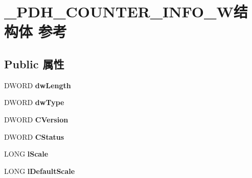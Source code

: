 \hypertarget{struct___p_d_h___c_o_u_n_t_e_r___i_n_f_o___w}{}\section{\+\_\+\+P\+D\+H\+\_\+\+C\+O\+U\+N\+T\+E\+R\+\_\+\+I\+N\+F\+O\+\_\+\+W结构体 参考}
\label{struct___p_d_h___c_o_u_n_t_e_r___i_n_f_o___w}
\subsection*{Public 属性}
\begin{DoxyCompactItemize}
\item 
\mbox{\label{struct___p_d_h___c_o_u_n_t_e_r___i_n_f_o___w_a395d1a0274f4159310aa4cfe40bd3974}} 
D\+W\+O\+RD {\bfseries dw\+Length}
\item 
\mbox{\label{struct___p_d_h___c_o_u_n_t_e_r___i_n_f_o___w_a4f3613d498a332fa1ad39e84be0a0c95}} 
D\+W\+O\+RD {\bfseries dw\+Type}
\item 
\mbox{\label{struct___p_d_h___c_o_u_n_t_e_r___i_n_f_o___w_af6c31efa21f65e8c1647c1c4a7a68234}} 
D\+W\+O\+RD {\bfseries C\+Version}
\item 
\mbox{\label{struct___p_d_h___c_o_u_n_t_e_r___i_n_f_o___w_a2d04a6442c4270484a4e435248802b89}} 
D\+W\+O\+RD {\bfseries C\+Status}
\item 
\mbox{\label{struct___p_d_h___c_o_u_n_t_e_r___i_n_f_o___w_a0e9d095546224caf786f7e84dbcbb08f}} 
L\+O\+NG {\bfseries l\+Scale}
\item 
\mbox{\label{struct___p_d_h___c_o_u_n_t_e_r___i_n_f_o___w_a6e27cb0da42ad30d9a076bcb511b9b00}} 
L\+O\+NG {\bfseries l\+Default\+Scale}
\item 
\mbox{\label{struct___p_d_h___c_o_u_n_t_e_r___i_n_f_o___w_afe4247fd88318c4a3200eefa460574e9}} 

\end{DoxyCompactItemize}
